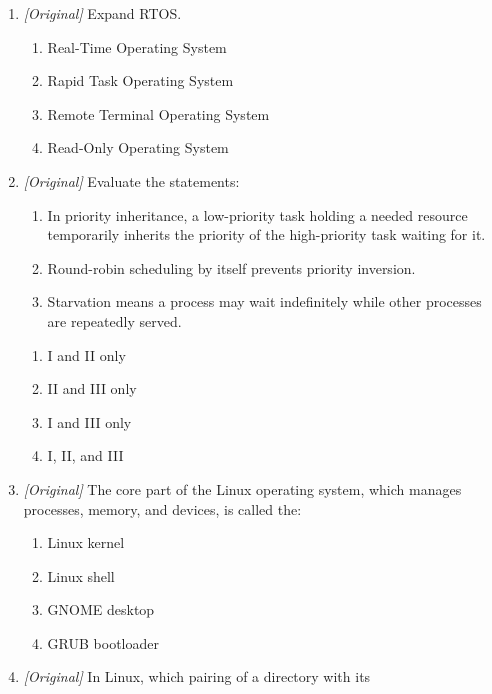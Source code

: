 \documentclass[11pt]{article}
\begin{document}
\begin{enumerate}[label=\textbf{Q\arabic*.}, leftmargin=*]
\begin{enumerate}[label=\Alph*.]
    \item a process with a higher priority becomes ready.
    \item the running process performs an input/output operation only.
    \item the running process requests more memory only.
  \end{enumerate}
\item \textit{[Original]} Expand RTOS.
  \begin{enumerate}[label=\Alph*.]
    \item Real-Time Operating System
    \item Rapid Task Operating System
    \item Remote Terminal Operating System
    \item Read-Only Operating System
  \end{enumerate}
\item \textit{[Original]} Evaluate the statements:
  \begin{enumerate}[label=\Roman*.]
    \item In priority inheritance, a low-priority task holding a needed
      resource temporarily inherits the priority of the high-priority task
      waiting for it.
    \item Round-robin scheduling by itself prevents priority inversion.
    \item Starvation means a process may wait indefinitely while other
      processes are repeatedly served.
  \end{enumerate}
  \begin{enumerate}[label=\Alph*.]
    \item I and II only
    \item II and III only
    \item I and III only
    \item I, II, and III
  \end{enumerate}
\item \textit{[Original]} The core part of the Linux operating system, which
  manages processes, memory, and devices, is called the:
  \begin{enumerate}[label=\Alph*.]
    \item Linux kernel
    \item Linux shell
    \item GNOME desktop
    \item GRUB bootloader
  \end{enumerate}
\item \textit{[Original]} In Linux, which pairing of a directory with its

\end{enumerate}
\end{document}
